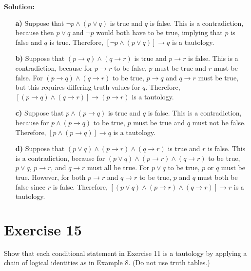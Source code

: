 \documentclass{Axon}
\begin{document}
\noindent
\textbf{Solution:}
\begin{enumerate}
    \item[\textbf{a)}] Suppose that \(\lnot p \land (p \lor q)\) is true and \(q\) is false. This is a contradiction, because then \(p \lor q\) and \(\lnot p\) would both have to be true, implying that \(p\) is false and \(q\) is true. Therefore, \([\lnot p \land (p \lor q)] \to q\) is a tautology.
    \item[\textbf{b)}] Suppose that \((p \to q) \land (q \to r)\) is true and \(p \to r\) is false. This is a contradiction, because for \(p \to r\) to be false, \(p\) must be true and \(r\) must be false. For \((p \to q) \land (q \to r)\) to be true, \(p \to q\) and \(q \to r\) must be true, but this requires differing truth values for \(q\). Therefore, \([(p \to q) \land (q \to r)] \to (p \to r)\) is a tautology.
    \item[\textbf{c)}] Suppose that \(p \land (p \to q)\) is true and \(q\) is false. This is a contradiction, because for \(p \land (p \to q)\) to be true, \(p\) must be true and \(q\) must not be false. Therefore, \([p \land (p \to q)] \to q\) is a tautology.
    \item[\textbf{d)}] Suppose that \((p \lor q) \land (p \to r) \land (q \to r)\) is true and \(r\) is false. This is a contradiction, because for \((p \lor q) \land (p \to r) \land (q \to r)\) to be true, \(p \lor q\), \(p \to r\), and \(q \to r\) must all be true. For \(p \lor q\) to be true, \(p\) or \(q\) must be true. However, for both \(p \to r\) and \(q \to r\) to be true, \(p\) and \(q\) must both be false since \(r\) is false. Therefore,  \([(p \lor q) \land (p \to r) \land (q \to r)] \to r\) is a tautology.
\end{enumerate}

\section*{Exercise 15}
Show that each conditional statement in Exercise 11 is a tautology by applying a chain of logical identities as in Example 8. (Do not use truth tables.)
\end{document}
